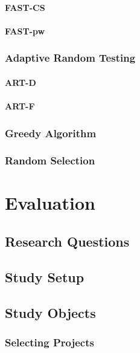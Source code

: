 \documentclass[a4paper,10pt]{article}
\begin{document}
\paragraph{FAST-CS}

\paragraph{FAST-pw}

\subsubsection{Adaptive Random Testing}

\paragraph{ART-D}

\paragraph{ART-F}

\subsubsection{Greedy Algorithm}

\subsubsection{Random Selection}

\section{Evaluation}

\subsection{Research Questions}

\subsection{Study Setup}

\subsection{Study Objects}

\subsubsection{Selecting Projects}
\end{document}
